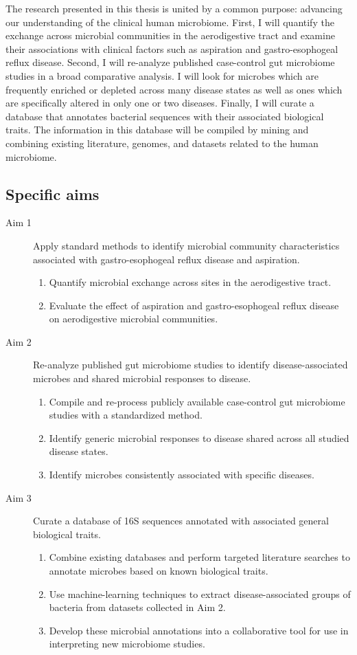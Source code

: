 \documentclass[12pt]{article}
\begin{document}
The research presented in this thesis is united by a common purpose: 
advancing our understanding of the clinical human microbiome.
First, I will quantify the exchange across microbial communities
in the aerodigestive tract and examine their associations with clinical factors
such as aspiration and gastro-esophogeal reflux disease.
Second, I will re-analyze published case-control gut microbiome studies in a 
broad comparative analysis. 
I will look for microbes which are frequently enriched or depleted
across many disease states as well as ones which are specifically 
altered in only one or two diseases. 
Finally, I will curate a database that annotates bacterial sequences 
with their associated biological traits. The information in this database will
be compiled by mining and combining existing literature, genomes, and datasets
related to the human microbiome.

\subsection{Specific aims}
\begin{description}
	\item[Aim 1] Apply standard methods to identify microbial 
	community characteristics associated with gastro-esophogeal reflux 
	disease and aspiration.
	\begin{enumerate}
		\item Quantify microbial exchange across sites in the aerodigestive 
		tract.
		\item Evaluate the effect of aspiration and gastro-esophogeal 
		reflux disease on aerodigestive microbial communities.
	\end{enumerate}
	\item[Aim 2] Re-analyze published gut 
	microbiome studies to identify disease-associated microbes and shared
	microbial responses to disease.
	\begin{enumerate}
		\item Compile and re-process publicly available case-control gut 
		microbiome studies with a standardized method.
		\item Identify generic microbial responses to disease shared across all studied disease states.
		\item Identify microbes consistently associated with specific diseases.
	\end{enumerate}
	\item[Aim 3] Curate a database of 16S sequences annotated with 
	associated general biological traits.
	\begin{enumerate}
		\item Combine existing databases and perform targeted literature searches 
		to annotate microbes based on known biological 
		traits.
		\item Use machine-learning techniques to extract disease-associated 
		groups of bacteria from datasets collected in Aim 2.
		\item Develop these microbial annotations into a collaborative 
		tool for use in interpreting new microbiome studies.
	\end{enumerate}
\end{description}
\newpage
\end{document}
